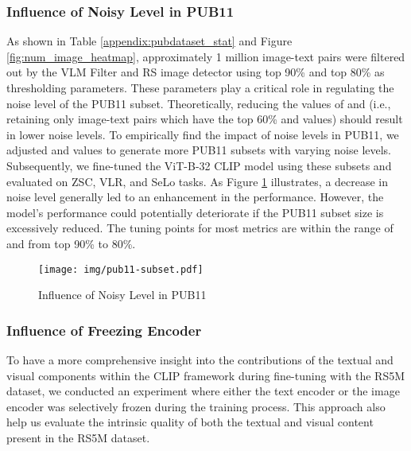 \documentclass[journal]{IEEEtran}
\begin{document}
\subsubsection{Influence of Noisy Level in PUB11} As shown in Table \ref{appendix:pubdataset_stat} and Figure \ref{fig:num_image_heatmap}, approximately 1 million image-text pairs were filtered out by the VLM Filter and RS image detector using top 90\%  and top 80\%  as thresholding parameters. These parameters play a critical role in regulating the noise level of the PUB11 subset. Theoretically, reducing the values of  and  (i.e., retaining only image-text pairs which have the top 60\%  and  values) should result in lower noise levels. To empirically find the impact of noise levels in PUB11, we adjusted  and  values to generate more PUB11 subsets with varying noise levels. Subsequently, we fine-tuned the ViT-B-32 CLIP model using these subsets and evaluated on ZSC, VLR, and SeLo tasks. As Figure \ref{fig:noise_level} illustrates, a decrease in noise level generally led to an enhancement in the performance. However, the model's performance could potentially deteriorate if the PUB11 subset size is excessively reduced. The tuning points for most metrics are within the range of  and  from top 90\% to 80\%.

\begin{figure}
    \centering
    \texttt{[image: img/pub11-subset.pdf]}
    \caption{Influence of Noisy Level in PUB11}
    \label{fig:noise_level}
\end{figure}


\subsubsection{Influence of Freezing Encoder}

To have a more comprehensive insight into the contributions of the textual and visual components within the CLIP framework during fine-tuning with the RS5M dataset, we conducted an experiment where either the text encoder or the image encoder was selectively frozen during the training process. This approach also help us evaluate the intrinsic quality of both the textual and visual content present in the RS5M dataset.
\end{document}
